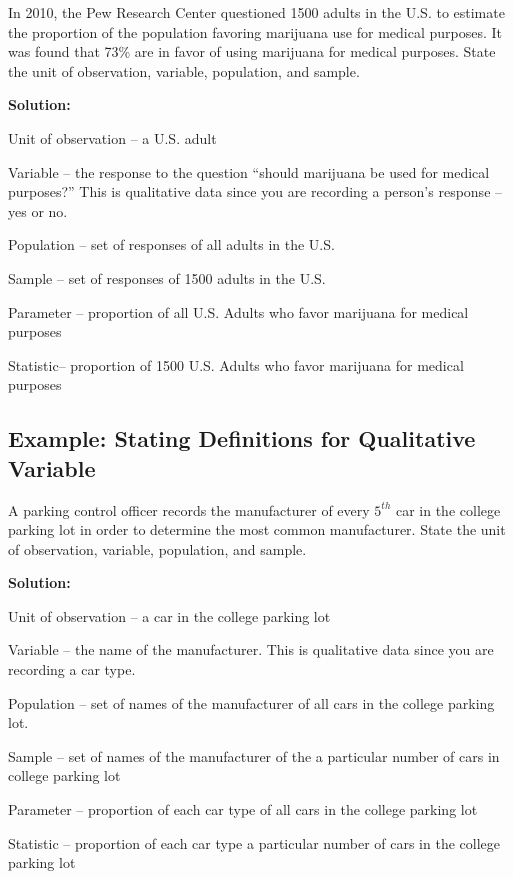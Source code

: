 \documentclass[
]{book}
\begin{document}
In 2010, the Pew Research Center questioned 1500 adults in the U.S. to estimate the proportion of the population favoring marijuana use for medical purposes. It was found that 73\% are in favor of using marijuana for medical purposes. State the unit of observation, variable, population, and sample.

\textbf{Solution:}

Unit of observation -- a U.S. adult

Variable -- the response to the question ``should marijuana be used for medical purposes?'' This is qualitative data since you are recording a person's response -- yes or no.

Population -- set of responses of all adults in the U.S.

Sample -- set of responses of 1500 adults in the U.S.

Parameter -- proportion of all U.S. Adults who favor marijuana for medical purposes

Statistic-- proportion of 1500 U.S. Adults who favor marijuana for medical purposes

\hypertarget{example-stating-definitions-for-qualitative-variable-1}{%
\subsection{Example: Stating Definitions for Qualitative Variable}\label{example-stating-definitions-for-qualitative-variable-1}}

A parking control officer records the manufacturer of every \(5^{th}\) car in the college parking lot in order to determine the most common manufacturer. State the unit of observation, variable, population, and sample.

\textbf{Solution:}

Unit of observation -- a car in the college parking lot

Variable -- the name of the manufacturer. This is qualitative data since you are recording a car type.

Population -- set of names of the manufacturer of all cars in the college parking lot.

Sample -- set of names of the manufacturer of the a particular number of cars in college parking lot

Parameter -- proportion of each car type of all cars in the college parking lot

Statistic -- proportion of each car type a particular number of cars in the college parking lot
\end{document}
